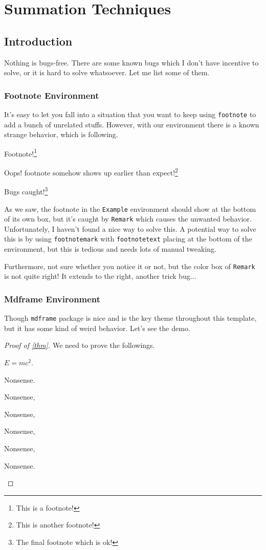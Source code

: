 \chapter{Summation Techniques}

\section{Introduction}
Nothing is bugs-free. There are some known bugs which I don't have incentive to solve, or it is hard to solve whatsoever. Let me list some of them.

\subsection{Footnote Environment}
It's easy to let you fall into a situation that you want to keep using \texttt{footnote} to add a bunch of unrelated stuffs. However, with our environment there is a known strange behavior, which is following.
\begin{eg}
	Footnote!\footnote{This is a footnote!}
	\begin{remark}
		Oops! footnote somehow shows up earlier than expect!\footnote{This is another footnote!}
	\end{remark}

	Bugs caught!\footnote{The final footnote which is ok!}
\end{eg}

As we saw, the footnote in the \texttt{Example} environment should show at the bottom of its own box, but it's caught by \texttt{Remark} which causes the unwanted behavior. Unfortunately, I haven't found a nice way to solve this. A potential way to solve this is by using \texttt{footnotemark} with \texttt{footnotetext} placing at the bottom of the environment, but this is tedious and needs lots of manual tweaking.

Furthermore, not sure whether you notice it or not, but the color box of \texttt{Remark} is not quite right! It extends to the right, another trick bug...

\subsection{Mdframe Environment}
Though \texttt{mdframe} package is nice and is the key theme throughout this template, but it has some kind of weird behavior. Let's see the demo.

\begin{proof}[Proof of \autoref{thm}]
	We need to prove the followings.
	\begin{claim}
		\(E = mc^{2} \).
	\end{claim}
	\begin{explanation}

		Nonsense.

		Nonsense,

		Nonsense,

		Nonsense,

		Nonsense,

		Nonsense.
	\end{explanation}

\end{proof}

